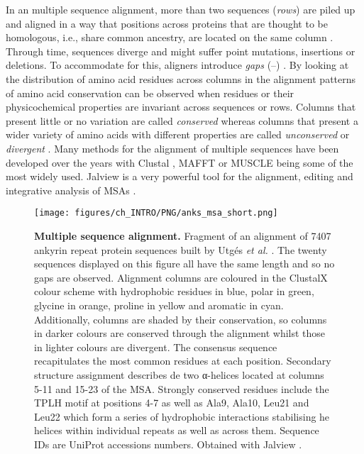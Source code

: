 In an multiple sequence alignment, more than two sequences (\textit{rows}) are piled up and aligned in a way that positions across proteins that are thought to be homologous, i.e., share common ancestry, are located on the same column \cite{NEEDLEMAN_1970_MSA}. Through time, sequences diverge and might suffer point mutations, insertions or deletions. To accommodate for this, aligners introduce \textit{gaps} (--) \cite{SMITH_1981_MSA}. By looking at the distribution of amino acid residues across columns in the alignment patterns of amino acid conservation can be observed when residues or their physicochemical properties are invariant across sequences or rows. Columns that present little or no variation are called \textit{conserved} whereas columns that present a wider variety of amino acids with different properties are called \textit{unconserved} or \textit{divergent} \cite{LIVINGSTONE_1993_CONS}. Many methods for the alignment of multiple sequences have been developed over the years with Clustal \cite{HIGGINS_1988_CLUSTAL, HIGGINS_1992_CLUSTALV, THOMPSON_1994_CLUSTALW, JEANMOUGIN_1998_CLUSTALX, SIEVERS_2011_CLUSTALO}, MAFFT \cite{KATOH_2002_MAFFT, KATOH_2008_MAFFT, KATOH_2013_MAFFT} or MUSCLE \cite{EDGAR_2004_MUSCLE, EDGAR_2022_MUSCLE5} being some of the most widely used. Jalview is a very powerful tool for the alignment, editing and integrative analysis of MSAs \cite{WATERHOUSE_2009_JALVIEW}.

\begin{figure}[htb!]
    \centering
    \texttt{[image: figures/ch\_INTRO/PNG/anks\_msa\_short.png]}
    \caption[Multiple sequence alignment]{\textbf{Multiple sequence alignment.} Fragment of an alignment of 7407 ankyrin repeat protein sequences built by Utgés \textit{et al.} \cite{UTGES_2021_ANKS}. The twenty sequences displayed on this figure all have the same length and so no gaps are observed. Alignment columns are coloured in the ClustalX colour scheme \cite{JEANMOUGIN_1998_CLUSTALX} with hydrophobic residues in blue, polar in green, glycine in orange, proline in yellow and aromatic in cyan. Additionally, columns are shaded by their conservation, so columns in darker colours are conserved through the alignment whilst those in lighter colours are divergent. The consensus sequence recapitulates the most common residues at each position. Secondary structure assignment describes de two α-helices located at columns 5-11 and 15-23 of the MSA. Strongly conserved residues include the TPLH motif at positions 4-7 as well as Ala9, Ala10, Leu21 and Leu22 which form a series of hydrophobic interactions stabilising he helices within individual repeats as well as across them. Sequence IDs are UniProt accessions numbers. Obtained with Jalview \cite{WATERHOUSE_2009_JALVIEW}.}
    \label{fig:MSA}
\end{figure}

